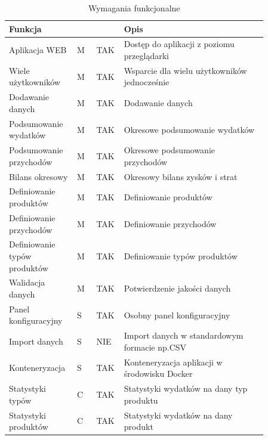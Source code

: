 \documentclass[a4paper, 10pt, twoside, openright]{report}
\newcommand{\customstyletable}[1]{\footnotesize{\textbf{#1}}}
\newcommand{\customstyletablecentered}[1]{\footnotesize\centering{\textbf{#1}}}
\begin{document}
\begin{large}
\begin{table}[H] %
    \caption{Wymagania funkcjonalne}
    \label{Wymagania funkcjonalne}
    \footnotesize
    \begin{tabular}{|p{0.2\linewidth}|p{0.07\linewidth}|p{0.07\linewidth}|p{0.52\linewidth}|}  %
    \hline                  %
    \customstyletable{Funkcja} & \customstyletablecentered{PRIO} & \customstyletablecentered{IMPL}& \customstyletable{Opis} \\
    \hline
    {Aplikacja WEB} & {M} & {TAK} & {Dostęp do aplikacji z poziomu przeglądarki}\\
    \hline
    {Wiele użytkowników} & {M} & {TAK} & {Wsparcie dla wielu użytkowników jednocześnie}\\
    \hline
    {Dodawanie danych} & {M} & {TAK} & {Dodawanie danych}\\
    \hline
    {Podsumowanie wydatków} & {M} & {TAK} & {Okresowe podsumowanie wydatków}\\
    \hline
    {Podsumowanie przychodów} & {M} & {TAK} & {Okresowe podsumowanie przychodów}\\
    \hline
    {Bilans okresowy} & {M} & {TAK} & {Okresowy bilans zysków i strat}\\
    \hline
    {Definiowanie produktów} & {M} & {TAK} & {Definiowanie produktów}\\
    \hline
    {Definiowanie przychodów} & {M} & {TAK} & {Definiowanie przychodów}\\
    \hline
    {Definiowanie typów produktów} & {M} & {TAK} & {Definiowanie typów produktów}\\
    \hline
    {Walidacja danych} & {M} & {TAK} & {Potwierdzenie jakości danych}\\
    \hline
    {Panel konfiguracyjny} & {S} & {TAK} & {Osobny panel konfiguracyjny}\\
    \hline
    {Import danych} & {S} & {NIE} & {Import danych w standardowym formacie np.CSV}\\
    \hline
    {Konteneryzacja} & {S} & {TAK} & {Konteneryzacja aplikacji w środowisku Docker}\\
    \hline
    {Statystyki typów} & {C} & {TAK} & {Statystyki wydatków na dany typ produktu}\\
    \hline
    {Statystyki produktów} & {C} & {TAK} & {Statystyki wydatków na dany produkt}\\

\end{tabular}
\end{table}
\end{large}
\end{document}

